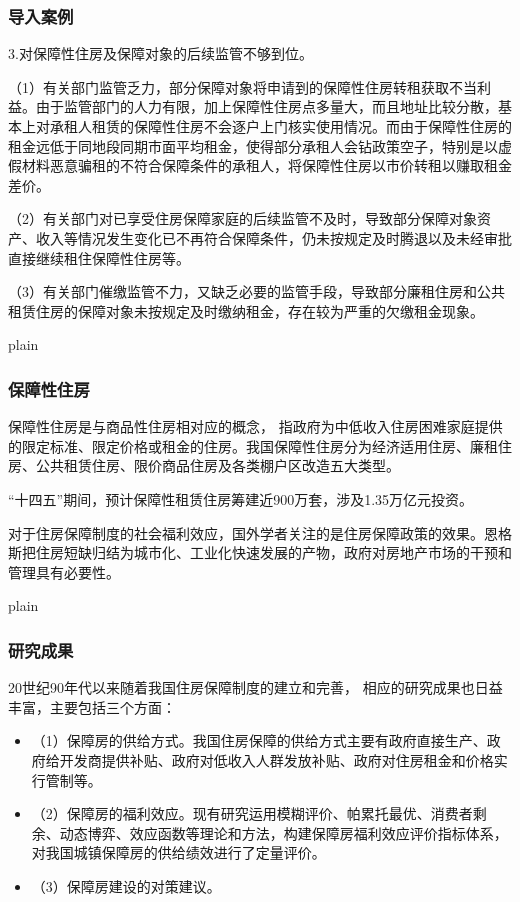 \documentclass[aspectratio=169, 12pt]{beamer}
\begin{document}
\begin{frame}[plain]
    \frametitle{导入案例}
    3.对保障性住房及保障对象的后续监管不够到位。\par
    \par
    （1）有关部门监管乏力，部分保障对象将申请到的保障性住房转租获取不当利益。由于监管部门的人力有限，加上保障性住房点多量大，而且地址比较分散，基本上对承租人租赁的保障性住房不会逐户上门核实使用情况。而由于保障性住房的租金远低于同地段同期市面平均租金，使得部分承租人会钻政策空子，特别是以虚假材料恶意骗租的不符合保障条件的承租人，将保障性住房以市价转租以赚取租金差价。
    \par
    （2）有关部门对已享受住房保障家庭的后续监管不及时，导致部分保障对象资产、收入等情况发生变化已不再符合保障条件，仍未按规定及时腾退以及未经审批直接继续租住保障性住房等。
    \par
    （3）有关部门催缴监管不力，又缺乏必要的监管手段，导致部分廉租住房和公共租赁住房的保障对象未按规定及时缴纳租金，存在较为严重的欠缴租金现象。
\end{frame}

\begin{frame}{plain}
    \frametitle{保障性住房}
    保障性住房是与商品性住房相对应的概念，
    指政府为中低收入住房困难家庭提供的限定标准、限定价格或租金的住房。我国保障性住房分为经济适用住房、廉租住房、公共租赁住房、限价商品住房及各类棚户区改造五大类型。\par
    \par
    “十四五”期间，预计保障性租赁住房筹建近900万套，涉及1.35万亿元投资。
    \par
    对于住房保障制度的社会福利效应，国外学者关注的是住房保障政策的效果。恩格斯把住房短缺归结为城市化、工业化快速发展的产物，政府对房地产市场的干预和管理具有必要性。
\end{frame}

\begin{frame}{plain}
    \frametitle{研究成果}
    20世纪90年代以来随着我国住房保障制度的建立和完善，
    相应的研究成果也日益丰富，主要包括三个方面：
    \begin{itemize}
        \item （1）保障房的供给方式。我国住房保障的供给方式主要有政府直接生产、政府给开发商提供补贴、政府对低收入人群发放补贴、政府对住房租金和价格实行管制等。
        \item （2）保障房的福利效应。现有研究运用模糊评价、帕累托最优、消费者剩余、动态博弈、效应函数等理论和方法，构建保障房福利效应评价指标体系，对我国城镇保障房的供给绩效进行了定量评价。
        \item （3）保障房建设的对策建议。
    \end{itemize}
\end{frame}
\end{document}
